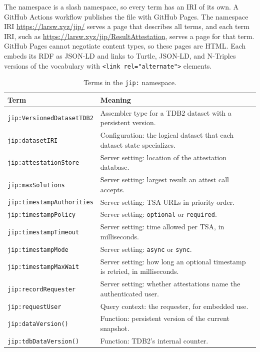 \documentclass[11pt,a4paper]{article}
\newcommand{\code}[1]{\texttt{#1}}
\begin{document}
The namespace is a slash namespace, so every term has an IRI of its own. A GitHub Actions
workflow publishes the file with GitHub Pages. The namespace IRI
\mbox{\url{https://larsw.xyz/jip/}} serves a page that describes all terms, and each term IRI, such as
\mbox{\url{https://larsw.xyz/jip/ResultAttestation}}, serves a page for that term. GitHub Pages
cannot negotiate content types, so these pages are HTML. Each embeds its RDF as JSON-LD and links
to Turtle, JSON-LD, and N-Triples versions of the vocabulary with \code{<link rel="alternate">}
elements.

\begin{table}[ht]
\centering
\caption{Terms in the \code{jip:} namespace.}
\label{tab:vocab}
\small
\begin{tabularx}{\linewidth}{@{}>{\raggedright\arraybackslash}p{44mm}>{\raggedright\arraybackslash}X@{}}
\toprule
Term & Meaning \\
\midrule
\code{jip:VersionedDatasetTDB2} & Assembler type for a TDB2 dataset with a persistent
version. \\
\code{jip:datasetIRI} & Configuration: the logical dataset that each dataset state
specializes. \\
\code{jip:attestationStore} & Server setting: location of the attestation database. \\
\code{jip:maxSolutions} & Server setting: largest result an attest call accepts. \\
\code{jip:timestampAuthorities} & Server setting: TSA URLs in priority order. \\
\code{jip:timestampPolicy} & Server setting: \code{optional} or \code{required}. \\
\code{jip:timestampTimeout} & Server setting: time allowed per TSA, in milliseconds. \\
\code{jip:timestampMode} & Server setting: \code{async} or \code{sync}. \\
\code{jip:timestampMaxWait} & Server setting: how long an optional timestamp is retried, in
milliseconds. \\
\code{jip:recordRequester} & Server setting: whether attestations name the authenticated user. \\
\code{jip:requestUser} & Query context: the requester, for embedded use. \\
\code{jip:dataVersion()} & Function: persistent version of the current snapshot. \\
\code{jip:tdbDataVersion()} & Function: TDB2's internal counter. \\

\end{tabularx}
\end{table}
\end{document}
